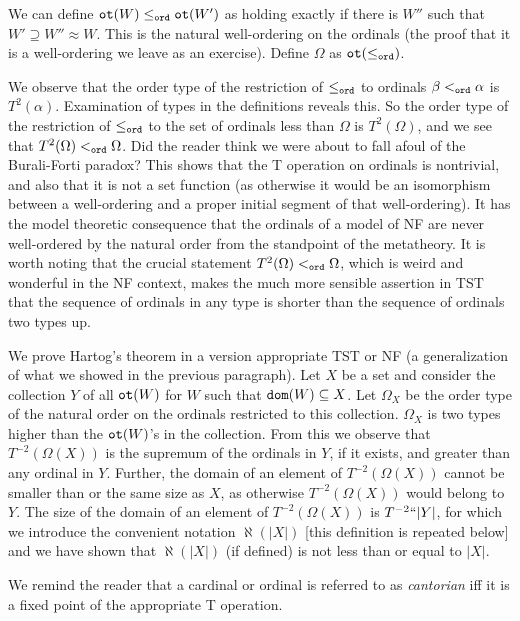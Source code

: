 \documentclass[12pt]{article}
\begin{document}
We can define ${\tt ot}(W) \leq_{\tt ord} {\tt ot}(W')$ as holding exactly if there is $W''$ such that $W' \supseteq W'' \approx W$.  This is the natural well-ordering on the ordinals (the proof that it is a well-ordering
we leave as an exercise).   Define $\Omega$ as ${\tt ot}(\leq_{\tt ord})$.

We observe that the order type of the restriction of $\leq_{\tt ord}$ to ordinals $\beta <_{\tt ord} \alpha$ is $T^2(\alpha)$.  Examination of types in the definitions reveals this.   So the order type
of the restriction of $\leq_{\tt ord}$ to the set of ordinals less than $\Omega$ is $T^2(\Omega)$, and we see that $T^2(\Omega) <_{\tt ord} \Omega$.  Did the reader think we were about to fall afoul of the Burali-Forti paradox?  This shows that the T operation on ordinals is nontrivial, and also that it is not a set function (as otherwise it would be an isomorphism between a well-ordering and a proper initial segment of that well-ordering).  It has the model theoretic consequence that the ordinals of a model of NF are never well-ordered by the natural order from the standpoint of the metatheory.   It is worth noting that the crucial statement 
$T^2(\Omega) <_{\tt ord} \Omega$, which is weird and wonderful in the NF context, makes the much more sensible assertion in TST that the sequence of ordinals in any type is shorter than the sequence of ordinals two types up.

We prove Hartog's theorem in a version appropriate TST or NF (a generalization of what we showed in the previous paragraph).  Let $X$ be a set and consider the collection $Y$ of all ${\tt ot}(W)$ for $W$ such that
${\tt dom}(W) \subseteq X$.  Let $\Omega_X$ be the order type of the natural order on the ordinals restricted to this collection.  $\Omega_X$ is two types higher than the ${\tt ot}(W)$'s in the collection.   From this we observe that $T^{-2}(\Omega(X))$ is the supremum of the ordinals in $Y$, if it exists, and greater than any ordinal in $Y$.  Further, the domain of an element of $T^{-2}(\Omega(X))$ cannot be smaller than or the same size as $X$,
as otherwise $T^{-2}(\Omega(X))$ would belong to $Y$.   The size of the domain of an element of $T^{-2}(\Omega(X))$ is $T^{-2}``|Y|$, for which we introduce the convenient notation $\aleph(|X|)$ [this definition is repeated below] and we have shown that $\aleph(|X|)$ (if defined) is not less than or equal to $|X|$.

We remind the reader that a cardinal or ordinal is referred to as {\em cantorian\/} iff it is a fixed point of the appropriate T operation.
\end{document}
